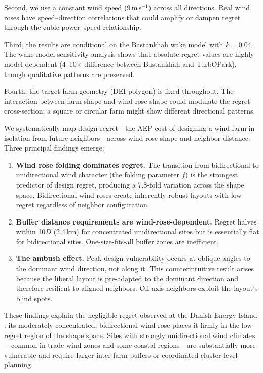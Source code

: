 \documentclass[manuscript, 12pt]{copernicus}
\begin{document}
Second, we use a constant wind speed (9\,m\,s$^{-1}$) across all directions.
Real wind roses have speed--direction correlations that could amplify or dampen regret through the cubic power--speed relationship.

Third, the results are conditional on the Bastankhah wake model with $k = 0.04$.
The wake model sensitivity analysis shows that absolute regret values are highly model-dependent (4--10$\times$ difference between Bastankhah and TurbOPark), though qualitative patterns are preserved.

Fourth, the target farm geometry (DEI polygon) is fixed throughout.
The interaction between farm shape and wind rose shape could modulate the regret cross-section; a square or circular farm might show different directional patterns.

\conclusions

We systematically map design regret---the AEP cost of designing a wind farm in isolation from future neighbors---across wind rose shape and neighbor distance.
Three principal findings emerge:

\begin{enumerate}
    \item \textbf{Wind rose folding dominates regret.}
    The transition from bidirectional to unidirectional wind character (the folding parameter $f$) is the strongest predictor of design regret, producing a 7.8-fold variation across the shape space.
    Bidirectional wind roses create inherently robust layouts with low regret regardless of neighbor configuration.

    \item \textbf{Buffer distance requirements are wind-rose-dependent.}
    Regret halves within 10$D$ (2.4\,km) for concentrated unidirectional sites but is essentially flat for bidirectional sites.
    One-size-fits-all buffer zones are inefficient.

    \item \textbf{The ambush effect.}
    Peak design vulnerability occurs at oblique angles to the dominant wind direction, not along it.
    This counterintuitive result arises because the liberal layout is pre-adapted to the dominant direction and therefore resilient to aligned neighbors.
    Off-axis neighbors exploit the layout's blind spots.
\end{enumerate}

These findings explain the negligible regret observed at the Danish Energy Island \citep{Quick2026omae}: its moderately concentrated, bidirectional wind rose places it firmly in the low-regret region of the shape space.
Sites with strongly unidirectional wind climates---common in trade-wind zones and some coastal regions---are substantially more vulnerable and require larger inter-farm buffers or coordinated cluster-level planning.
\end{document}
